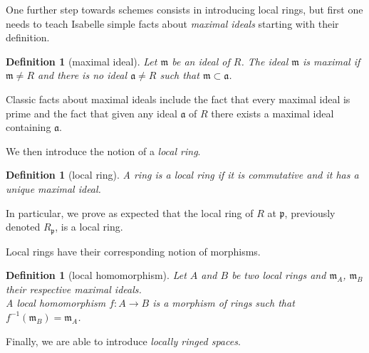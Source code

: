 \documentclass[12pt]{scrartcl}
\newtheorem{definition}[proposition]{Definition}
\begin{document}

One further step towards schemes consists in introducing local rings, but first one needs to teach Isabelle simple facts about \emph{maximal ideals} starting with their definition. 

\begin{definition}[maximal ideal]
	Let $\mathfrak{m}$ be an ideal of $R$. The ideal $\mathfrak{m}$ is maximal if $\mathfrak{m} \neq R$ and there is no ideal $\mathfrak{a} \neq R$ such that $\mathfrak{m} \subset \mathfrak{a}$.
\end{definition}


Classic facts about maximal ideals include the fact that every maximal ideal is prime and the fact that given any ideal $\mathfrak{a}$ of $R$ there exists a maximal ideal containing $\mathfrak{a}$.

	
We then introduce the notion of a \emph{local ring}.

\begin{definition}[local ring]
	A ring is a local ring if it is commutative and it has a unique maximal ideal. 	
\end{definition}


In particular, we prove as expected that the local ring of $R$ at $\mathfrak{p}$, previously denoted $R_{\mathfrak{p}}$, is a local ring.


Local rings have their corresponding notion of morphisms. 

\begin{definition}[local homomorphism]
	Let $A$ and $B$ be two local rings and $\mathfrak{m}_A$, $\mathfrak{m}_B$ their respective maximal ideals. \\
	A local homomorphism $f: A \rightarrow B$ is a morphism of rings such that $f^{-1} (\mathfrak{m}_B) = \mathfrak{m}_A$. 
\end{definition}


Finally, we are able to introduce \emph{locally ringed spaces}.
\end{document}
